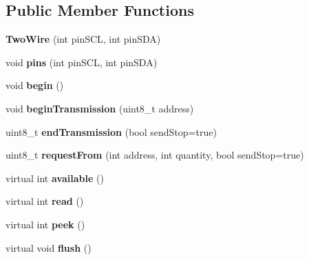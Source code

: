 \subsection*{Public Member Functions}
\begin{DoxyCompactItemize}
\item 
\hypertarget{class_two_wire_abadaa81a613d6e6acabf3dc9ab9a7ec9}{}{\bfseries Two\+Wire} (int pin\+S\+C\+L, int pin\+S\+D\+A)\label{class_two_wire_abadaa81a613d6e6acabf3dc9ab9a7ec9}

\item 
\hypertarget{class_two_wire_a3f9f7e4edd0604510ed36d8a57713d73}{}void {\bfseries pins} (int pin\+S\+C\+L, int pin\+S\+D\+A)\label{class_two_wire_a3f9f7e4edd0604510ed36d8a57713d73}

\item 
\hypertarget{class_two_wire_ada85a7a8663ec8af0a1248b659be2f18}{}void {\bfseries begin} ()\label{class_two_wire_ada85a7a8663ec8af0a1248b659be2f18}

\item 
\hypertarget{class_two_wire_a1876ffdb16fb185c14a75e1251cef5e4}{}void {\bfseries begin\+Transmission} (uint8\+\_\+t address)\label{class_two_wire_a1876ffdb16fb185c14a75e1251cef5e4}

\item 
\hypertarget{class_two_wire_a4a228686907b7d2ee196dde8867e49e5}{}uint8\+\_\+t {\bfseries end\+Transmission} (bool send\+Stop=true)\label{class_two_wire_a4a228686907b7d2ee196dde8867e49e5}

\item 
\hypertarget{class_two_wire_a0e50649904e8fd7e2ca4bfce1d78ae55}{}uint8\+\_\+t {\bfseries request\+From} (int address, int quantity, bool send\+Stop=true)\label{class_two_wire_a0e50649904e8fd7e2ca4bfce1d78ae55}

\item 
\hypertarget{class_two_wire_a5eb3b5e06ed2119826edd8aea9f0dad7}{}virtual int {\bfseries available} ()\label{class_two_wire_a5eb3b5e06ed2119826edd8aea9f0dad7}

\item 
\hypertarget{class_two_wire_aba1bdc5983078eb80eea453c80547fce}{}virtual int {\bfseries read} ()\label{class_two_wire_aba1bdc5983078eb80eea453c80547fce}

\item 
\hypertarget{class_two_wire_a5760b714d8b62c3bb7660c8382873fe5}{}virtual int {\bfseries peek} ()\label{class_two_wire_a5760b714d8b62c3bb7660c8382873fe5}

\item 
\hypertarget{class_two_wire_aba76990521c2aa776eb5cbb8759f94b0}{}virtual void {\bfseries flush} ()\label{class_two_wire_aba76990521c2aa776eb5cbb8759f94b0}


\end{DoxyCompactItemize}
